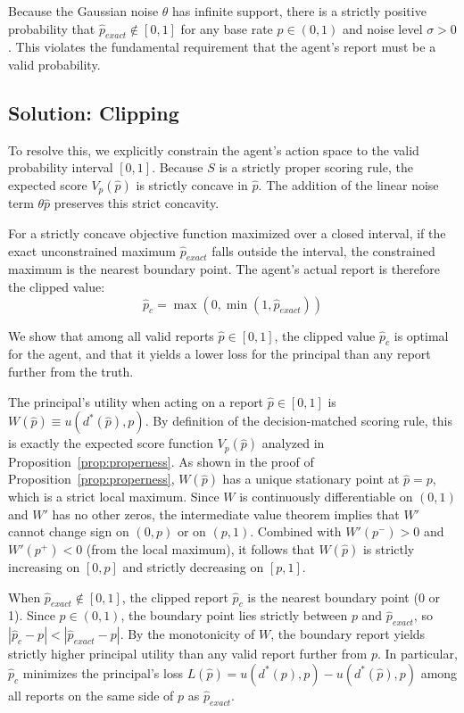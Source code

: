 \documentclass[11pt]{article}
\begin{document}
Because the Gaussian noise $\theta$ has infinite support, there is a strictly positive probability that $\hat{p}_{exact} \notin [0,1]$ for any base rate $p \in (0,1)$ and noise level $\sigma > 0$. This violates the fundamental requirement that the agent's report must be a valid probability.

\subsection{Solution: Clipping}

To resolve this, we explicitly constrain the agent's action space to the valid probability interval $[0, 1]$. Because $S$ is a strictly proper scoring rule, the expected score $V_p(\hat{p})$ is strictly concave in $\hat{p}$. The addition of the linear noise term $\theta\hat{p}$ preserves this strict concavity.

For a strictly concave objective function maximized over a closed interval, if the exact unconstrained maximum $\hat{p}_{exact}$ falls outside the interval, the constrained maximum is the nearest boundary point. The agent's actual report is therefore the clipped value:
\begin{equation}
	\hat{p}_c = \max(0, \min(1, \hat{p}_{exact}))
\end{equation}

We show that among all valid reports $\hat{p} \in [0,1]$, the clipped value $\hat{p}_c$ is optimal for the agent, and that it yields a lower loss for the principal than any report further from the truth.

The principal's utility when acting on a report $\hat{p} \in [0,1]$ is $W(\hat{p}) \equiv u(d^*(\hat{p}), p)$. By definition of the decision-matched scoring rule, this is exactly the expected score function $V_p(\hat{p})$ analyzed in Proposition~\ref{prop:properness}. As shown in the proof of Proposition~\ref{prop:properness}, $W(\hat{p})$ has a unique stationary point at $\hat{p} = p$, which is a strict local maximum. Since $W$ is continuously differentiable on $(0,1)$ and $W'$ has no other zeros, the intermediate value theorem implies that $W'$ cannot change sign on $(0,p)$ or on $(p,1)$. Combined with $W'(p^-) > 0$ and $W'(p^+) < 0$ (from the local maximum), it follows that $W(\hat{p})$ is strictly increasing on $[0, p]$ and strictly decreasing on $[p, 1]$.

When $\hat{p}_{exact} \notin [0,1]$, the clipped report $\hat{p}_c$ is the nearest boundary point (0 or 1). Since $p \in (0,1)$, the boundary point lies strictly between $p$ and $\hat{p}_{exact}$, so $|\hat{p}_c - p| < |\hat{p}_{exact} - p|$. By the monotonicity of $W$, the boundary report yields strictly higher principal utility than any valid report further from $p$. In particular, $\hat{p}_c$ minimizes the principal's loss $L(\hat{p}) = u(d^*(p), p) - u(d^*(\hat{p}), p)$ among all reports on the same side of $p$ as $\hat{p}_{exact}$.
\end{document}
